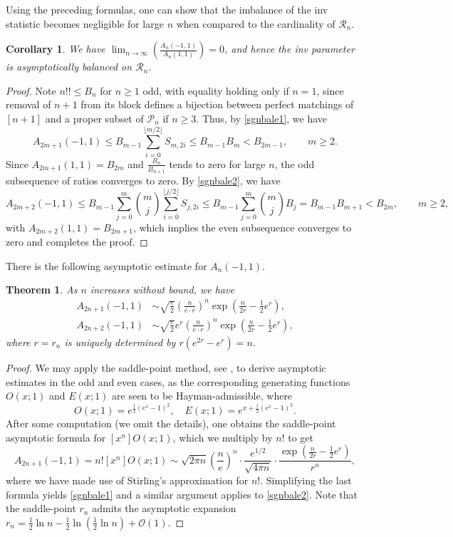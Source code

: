 \documentclass[11pt,a4paper]{article}
\newtheorem{corollary}{Corollary}[section]
\newtheorem{theorem}{Theorem}[section]
\begin{document}
Using the preceding formulas, one can show that the imbalance of the inv statistic becomes negligible for large $n$ when compared to the cardinality of $\mathcal{R}_n$.

\begin{corollary}\label{asymsign}
We have
$\lim_{n\rightarrow \infty}\left(\frac{A_n(-1,1)}{A_n(1,1)}\right)=0$,
and hence the inv parameter is asymptotically balanced on $\mathcal{R}_n$.
\end{corollary}
\begin{proof}
Note $n!! \leq B_n$ for $n\geq 1$ odd, with equality holding only if $n=1$, since removal of $n+1$ from its block defines a bijection between perfect matchings of $[n+1]$ and a proper subset of $\mathcal{P}_n$ if $n \geq 3$.  Thus, by \eqref{sgnbale1}, we have
$$A_{2m+1}(-1,1)\leq B_{m-1}\sum_{i=0}^{\lfloor m/2 \rfloor}S_{m,2i} \leq B_{m-1}B_m<B_{2m-1}, \qquad m \geq 2.$$
Since $A_{2m+1}(1,1)=B_{2m}$ and $\frac{B_{n}}{B_{n+1}}$ tends to zero for large $n$, the odd subsequence of ratios converges to zero.  By \eqref{sgnbale2}, we have
$$A_{2m+2}(-1,1)\leq B_{m-1}\sum_{j=0}^m\binom{m}{j}\sum_{i=0}^{\lfloor j/2 \rfloor}S_{j,2i} \leq B_{m-1}\sum_{j=0}^m \binom{m}{j}B_j=B_{m-1}B_{m+1}<B_{2m}, \qquad m \geq 2,$$
with $A_{2m+2}(1,1)=B_{2m+1}$, which implies the even subsequence converges to zero and completes the proof.
\end{proof}

There is the following asymptotic estimate for $A_{n}(-1,1)$.

\begin{theorem}\label{asymth}
As $n$ increases without bound, we have
\begin{align}
A_{2n+1}(-1,1)&\sim \sqrt{\frac{e}{2}} \left(\frac{n}{e \cdot r}\right)^n \exp\left(\frac{n}{2r} - \frac{1}{2}e^r\right),  \label{sgnbale1}\\
A_{2n+2}(-1,1)&\sim \sqrt{\frac{e}{2}}e^r \left(\frac{n}{e \cdot r}\right)^n \exp\left(\frac{n}{2r} - \frac{1}{2}e^r\right), \label{sgnbale2}
\end{align}
where $r = r_n$ is uniquely determined by $r\left(e^{2r} - e^r\right) = n$.
\end{theorem}
\begin{proof}
We may apply the saddle-point method, see \cite[Chapter VIII]{FlS}, to derive asymptotic estimates in the odd and even cases, as the corresponding generating functions $O(x;1)$ and $E(x;1)$ are seen to be Hayman-admissible, where
$$O(x;1)=e^{\frac{1}{2}(e^x-1)^2}, \quad E(x;1)=e^{x+\frac{1}{2}(e^x-1)^2}.$$
After some computation (we omit the details), one obtains the saddle-point asymptotic formula for $[x^n] O(x;1)$, which we multiply by $n!$ to get
\[
A_{2n+1}(-1,1)=n! [x^n] O(x;1) \sim \sqrt{2\pi n} \left(\frac{n}{e}\right)^n \cdot \frac{e^{1/2}}{\sqrt{4\pi n}} \cdot \frac{\exp\left(\frac{n}{2r} - \frac{1}{2}e^r\right)}{r^n},
\]
where we have made use of Stirling's approximation for $n!$.  Simplifying the last formula yields \eqref{sgnbale1} and a similar argument applies to \eqref{sgnbale2}.  Note that the saddle-point $r_n$ admits the asymptotic expansion $r_n = \frac{1}{2}\ln n - \frac{1}{2}\ln\left(\frac{1}{2}\ln n\right) + \mathcal{O}(1)$.
\end{proof}
\end{document}
